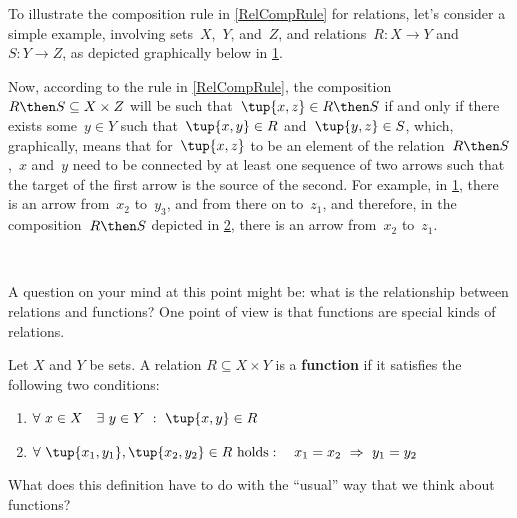 To illustrate the composition rule in \cref{RelCompRule} for relations, let's consider a simple example, involving sets~$X$,~$Y$, and~$Z$, and relations~$R \colon X \to Y$ and $S \colon Y \to Z$, as depicted graphically below in \cref{fig:example_rel_composable}.
\begin{figure}[h!]
\centering
{}
 \caption{}
\label{fig:example_rel_composable}
\end{figure}
Now, according to the rule in \cref{RelCompRule}, the composition~$R \then S \subseteq X \times Z$ will be such that~$\tup{x,z} \in R \then S$ if and only if there exists some~$y \in Y$ such that~$\tup{x,y} \in R$ and~$\tup{y,z} \in S$, which, graphically, means that for~$\tup{x,z}$ to be an element of the relation~$R \then S$,~$x$ and~$y$ need to be connected by at least one sequence of two arrows such that the target of the first arrow is the source of the second. For example, in \cref{fig:example_rel_composable}, there is an arrow from~$x_2$ to~$y_3$, and from there on to~$z_1$, and therefore, in the composition~$R \then S$ depicted in \cref{fig:example_rel_composed}, there is an arrow from~$x_2$ to~$z_1$.
\begin{figure}[h!]
\centering
{}
 \caption{}
\label{fig:example_rel_composed}
\end{figure}


\

A question on your mind at this point might be: what is the relationship between relations and functions? One point of view is that functions are special kinds of relations.

\begin{definition}\label{functions as relations}
Let $X$ and $Y$ be sets. A relation $R \subseteq X \times Y$ is a \textbf{function} if it satisfies the following two conditions:
\begin{enumerate}
\item $\forall \ x \in X \quad \exists \ y \in Y \ : \ \tup{x,y} \in R$
\item $\forall \ \tup{x_1, y_1}, \tup{x_2, y_2} \in R \  \text{holds}: \quad x_1 = x_2 \ \Rightarrow \ y_1 = y_2$
\end{enumerate}
\end{definition}

What does this definition have to do with the ``usual'' way that we think about functions?

